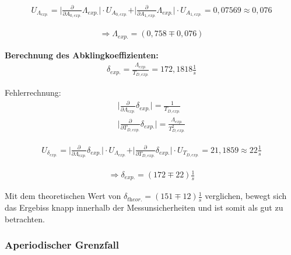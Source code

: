 \documentclass[a4paper]{scrartcl}
\numberwithin{equation}{subsection}
\begin{document}
\begin{align*}
U_{\Lambda_{\textit{exp.}}} = \vert \frac{\partial}{\partial A_{0,\textit{exp.}}}\Lambda_{\textit{exp.}}\vert \cdot U_{A_{0,\textit{exp.}}} + \vert \frac{\partial}{\partial A_{1,\textit{exp.}}}\Lambda_{\textit{exp.}}\vert \cdot U_{A_{1,\textit{exp.}}} = 0,07569 \approx 0,076 
\end{align*}

\begin{align*}
\Rightarrow \Lambda_{\textit{exp.}} = (0,758 \mp 0,076)
\end{align*}

\textbf{Berechnung des Abklingkoeffizienten:}
\begin{align}
\delta_{\textit{exp.}} = \frac{\Lambda_{\textit{exp.}}}{T_{D,\textit{exp.}}} = 172,1818 \frac{1}{s}
\end{align}

Fehlerrechnung:
\begin{align*}
\vert \frac{\partial}{\partial \Lambda_{\textit{exp.}}}\delta_{\textit{exp.}}\vert = \frac{1}{T_{D,\textit{exp.}}} \\
\vert \frac{\partial}{\partial T_{D,\textit{exp.}}}\delta_{\textit{exp.}}\vert = \frac{\Lambda_{\textit{exp.}}}{T_{D,\textit{exp.}}^2}
\end{align*}

\begin{align*}
U_{\delta_{\textit{exp.}}} = \vert \frac{\partial}{\partial \Lambda_{\textit{exp.}}}\delta_{\textit{exp.}}\vert \cdot U_{\Lambda_{\textit{exp.}}} + \vert \frac{\partial}{\partial T_{D,\textit{exp.}}}\delta_{\textit{exp.}}\vert \cdot U_{T_{D,\textit{exp.}}} = 21,1859 \approx 22 \frac{1}{s}
\end{align*}

\begin{align*}
\Rightarrow \delta_{\textit{exp.}} = (172 \mp 22) \frac{1}{s}
\end{align*}

Mit dem theoretischen Wert von $\delta_{\textit{theor.}} = (151 \mp 12) \frac{1}{s}$ verglichen, bewegt sich das Ergebiss knapp innerhalb der Messunsicherheiten und ist somit als gut zu betrachten.



\subsubsection{Aperiodischer Grenzfall}
\end{document}
